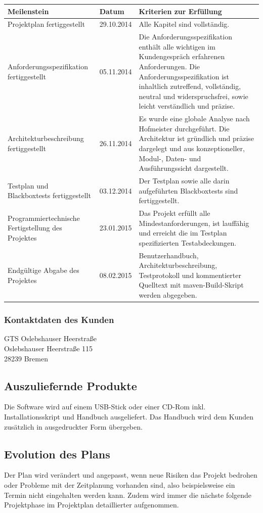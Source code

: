 \documentclass[fontsize=12pt,paper=a4,twoside]{scrartcl}
\begin{document}
\begin{tabularx}{\textwidth}{|p{5cm}|p{2cm}|X|}
\hline \textbf{Meilenstein} & \textbf{Datum} & \textbf{Kriterien zur Erfüllung} \\
\hline Projektplan fertiggestellt & 29.10.2014 & Alle Kapitel sind vollständig. \\
\hline Anforderungsspezifikation fertiggestellt & 05.11.2014 & Die Anforderungsspezifikation enthält alle wichtigen im Kundengespräch erfahrenen Anforderungen. Die Anforderungsspezifikation ist inhaltlich zutreffend, vollständig, neutral und widerspruchsfrei, sowie leicht verständlich und präzise.\\
\hline Architekturbeschreibung fertiggestellt & 26.11.2014 & Es wurde eine globale Analyse nach Hofmeister durchgeführt. Die Architektur ist gründlich und präzise dargelegt und aus konzeptioneller, Modul-, Daten- und Ausführungssicht dargestellt.   \\
\hline Testplan und Blackboxtests fertiggestellt & 03.12.2014 & Der Testplan sowie alle darin aufgeführten Blackboxtests sind fertiggestellt.\\
\hline Programmiertechnische Fertigstellung des Projektes & 23.01.2015 & Das Projekt erfüllt alle Mindestanforderungen, ist lauffähig und erreicht die im Testplan spezifizierten Testabdeckungen.\\
\hline Endgültige Abgabe des Projektes & 08.02.2015 & Benutzerhandbuch, Architekturbeschreibung, Testprotokoll und kommentierter Quelltext mit maven-Build-Skript werden abgegeben. \\
\hline
\end{tabularx}

\subsubsection{Kontaktdaten des Kunden}
GTS Oslebshauser Heerstraße \\
Oslebshauser Heerstraße 115\\
28239 Bremen \\


\subsection{Auszuliefernde Produkte}
Die Software wird auf einem USB-Stick oder einer CD-Rom inkl. Installationsskript und Handbuch ausgeliefert. Das Handbuch wird dem Kunden zusätzlich in ausgedruckter Form übergeben. 

\subsection{Evolution des Plans}
Der Plan wird verändert und angepasst, wenn neue Risiken das Projekt bedrohen oder Probleme mit der Zeitplanung vorhanden sind, also beispielsweise ein Termin nicht eingehalten werden kann. Zudem wird immer die nächste folgende Projektphase im Projektplan detaillierter aufgenommen.
\end{document}
